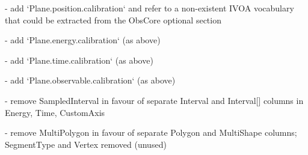 \documentclass[11pt,a4paper]{ivoa}
\begin{document}
- add `Plane.position.calibration` and refer to a non-existent IVOA vocabulary that could be extracted from the ObsCore optional section

- add `Plane.energy.calibration` (as above)

- add `Plane.time.calibration` (as above)

- add `Plane.observable.calibration` (as above)

- remove SampledInterval in favour of separate Interval and Interval[] columns in Energy, Time, CustomAxis

- remove MultiPolygon in favour of separate Polygon and MultiShape columns; SegmentType and Vertex removed (unused)


\end{document}
